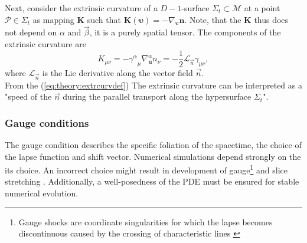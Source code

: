 % 

Next, consider the extrinsic curvature of a $D-1$-surface $\Sigma_t\subset\mathcal{M}$
at a point $\mathcal{P}\in\Sigma_t$ as mapping $\boldsymbol{K}$ such that $\boldsymbol{K}(\boldsymbol{\upsilon})=-\nabla_{\boldsymbol{\upsilon}}\boldsymbol{n}$. 
Note, that the $\boldsymbol{K}$ thus does not depend on $\alpha$ and $\vec{\beta}$, 
it is a purely spatial tensor. The components of the extrinsic curvature are
%
\begin{equation}
    K_{\mu\nu} = -{\gamma^{\alpha}}_{\mu}\nabla_{\boldsymbol{u}}^{\alpha} n_{\nu} = -\frac{1}{2}\mathcal{L}_{\vec{n}}\gamma_{\mu\nu},
    \label{eq:theory:extrcurvdef}
\end{equation}
%
where $\mathcal{L}_{\vec{n}}$ is the Lie derivative along the vector field $\vec{n}$. \\
From the (\ref{eq:theory:extrcurvdef}) 
%
The extrinsic curvature can be interpreted as a "speed of the $\vec{n}$ during the parallel 
transport along the hypersurface $\Sigma_t$".


\subsubsection{Gauge conditions}

The gauge condition describes the specific foliation of the spacetime, the choice of the 
lapse function and shift vector. 
%
Numerical simulations depend strongly on the its choice. An incorrect choice might result in development of 
gauge\footnote{Gauge shocks are coordinate singularities for which the lapse becomes discontinuous
    caused by the crossing of characteristic lines \citep{Alcubierre:2002kk}
} and slice stretching \citep{Reimann, 2004; Reimann, 2005}. Additionally, a well-posedness of the 
\ac{PDE} must be ensured for stable numerical evolution.

